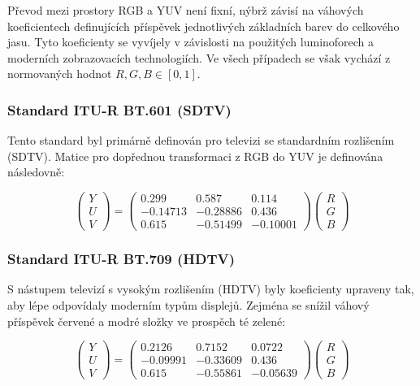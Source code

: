 \documentclass[FM,DP]{tulthesis}
\begin{document}
Převod mezi prostory RGB a YUV není fixní, nýbrž závisí na váhových
koeficientech definujících příspěvek jednotlivých základních barev do celkového
jasu. Tyto koeficienty se vyvíjely v závislosti na použitých luminoforech a
moderních zobrazovacích technologiích. Ve všech případech se však vychází z
normovaných hodnot $R, G, B \in [0, 1]$.

\subsubsection{Standard ITU-R BT.601 (SDTV)}
Tento standard byl primárně definován pro televizi se standardním rozlišením
(SDTV). Matice pro dopřednou transformaci z RGB do YUV je definována
následovně:

\begin{equation}
    \begin{pmatrix}
        Y \\
        U \\
        V
    \end{pmatrix}
    =
    \begin{pmatrix}
        0.299    & 0.587    & 0.114    \\
        -0.14713 & -0.28886 & 0.436    \\
        0.615    & -0.51499 & -0.10001
    \end{pmatrix}
    \begin{pmatrix}
        R \\
        G \\
        B
    \end{pmatrix}
    \label{eq:bt601}
\end{equation}

\subsubsection{Standard ITU-R BT.709 (HDTV)}
S nástupem televizí s vysokým rozlišením (HDTV) byly koeficienty upraveny tak,
aby lépe odpovídaly moderním typům displejů. Zejména se snížil váhový příspěvek
červené a modré složky ve prospěch té zelené:

\begin{equation}
    \begin{pmatrix}
        Y \\
        U \\
        V
    \end{pmatrix}
    =
    \begin{pmatrix}
        0.2126   & 0.7152   & 0.0722   \\
        -0.09991 & -0.33609 & 0.436    \\
        0.615    & -0.55861 & -0.05639
    \end{pmatrix}
    \begin{pmatrix}
        R \\
        G \\
        B
    \end{pmatrix}
    \label{eq:bt709}
\end{equation}
\end{document}
